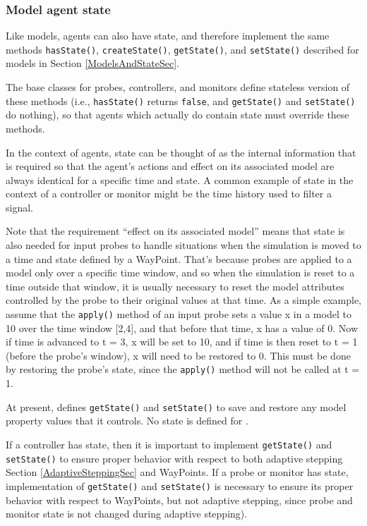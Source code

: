 \documentclass{article}
\begin{document}
\subsubsection{Model agent state}
\label{ModelAgentState}

Like models, agents can also have state, and therefore implement the
same methods {\tt hasState()}, {\tt createState()}, {\tt getState()},
and {\tt setState()} described for models in Section
\ref{ModelsAndStateSec}.

The base classes for probes, controllers, and monitors define
stateless version of these methods (i.e., {\tt hasState()} returns
{\tt false}, and {\tt getState()} and {\tt setState()} do nothing), so that agents
which actually do contain state must override these methods.

In the context of agents, state can be thought of as the internal
information that is required so that the agent's actions and effect on
its associated model are always identical for a specific time and
state.  A common example of state in the context of a controller or
monitor might be the time history used to filter a signal.

Note that the requirement ``effect on its associated model'' means
that state is also needed for input probes to handle situations when
the simulation is moved to a time and state defined by a
WayPoint. That's because probes are applied to a model only over a
specific time window, and so when the simulation is reset to a time
outside that window, it is usually necessary to reset the model
attributes controlled by the probe to their original values at that
time. As a simple example, assume that the {\tt apply()} method of an
input probe sets a value x in a model to 10 over the time window
[2,4], and that before that time, x has a value of 0. Now
if time is advanced to t = 3, x will be set to 10, and if time is then
reset to t = 1 (before the probe's window), x will need to be restored
to 0. This must be done by restoring the probe's
state, since the {\tt apply()} method will not be called at t = 1.

At present,  defines {\tt getState()} and
{\tt setState()} to save and restore any model property values that it
controls. No state is defined for .

\begin{sideblock}
If a controller has state, then it is important to implement
{\tt getState()} and {\tt setState()} to ensure proper behavior with
respect to both
adaptive stepping Section \ref{AdaptiveSteppingSec} and WayPoints.
If a probe or monitor has state, implementation
of {\tt getState()} and {\tt setState()} is necessary
to ensure its proper behavior with respect to WayPoints,
but not adaptive stepping, since probe and
monitor state is not changed during adaptive stepping).
\end{sideblock}
\end{document}
